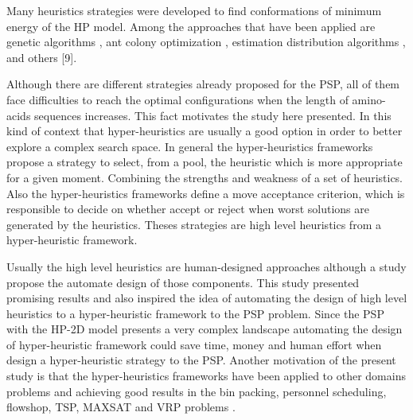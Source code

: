 \documentclass[conference]{IEEEtran}
\begin{document}

Many heuristics strategies were developed to find conformations of minimum energy of the HP model. Among the approaches that have been applied are genetic algorithms \cite{unger1993genetic}, ant colony optimization \cite{shmygelska2002ant, shmygelska2003improved}, estimation distribution algorithms \cite{santana2008component }, and others [9].


 Although there are different strategies already proposed for the PSP, all of them face difficulties to reach the optimal configurations when the length of amino-acids sequences increases. This fact motivates the study here presented. In this kind of context that hyper-heuristics are usually a good option in order to better explore a complex search space. In general the hyper-heuristics frameworks propose a strategy to select, from a pool, the heuristic which is more appropriate for a given moment. Combining the strengths and weakness of a set of heuristics. Also the hyper-heuristics frameworks define a move acceptance criterion, which is responsible to decide on whether accept or reject when worst solutions are generated by the heuristics. Theses strategies are high level heuristics from a hyper-heuristic framework. 
 
 Usually the high level heuristics are human-designed approaches although a study \cite{sabar2015automatic} propose the automate design of those components. This study presented promising results and also inspired the idea of automating the design of high level heuristics to a hyper-heuristic framework to the PSP problem. Since the PSP with the HP-2D model presents a very complex landscape automating the design of hyper-heuristic framework could save time, money and human effort when design a hyper-heuristic strategy to the PSP. Another motivation of the present study is that the hyper-heuristics frameworks have been applied to other domains problems and achieving good results in the bin packing, personnel scheduling, flowshop, TSP, MAXSAT and VRP problems \cite{sabar2015automatic}.
 
\end{document}
